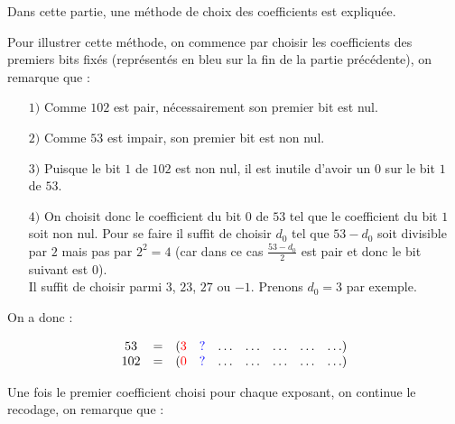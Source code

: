 \documentclass[12pt, a4paper]{memoir}
\begin{document}
 Dans cette partie, une méthode de choix des coefficients est expliquée.
 
 Pour illustrer cette méthode, on commence par choisir les coefficients des premiers bits fixés (représentés 
 en bleu sur la fin de la partie précédente), on remarque que :
 \begin{itemize}
  \item [$1)$] Comme $102$ est pair, nécessairement son premier bit est nul.
  \item [$2)$] Comme $53$ est impair, son premier bit est non nul.
  \item [$3)$] Puisque le bit $1$ de $102$ est non nul, il est inutile d'avoir un $0$ sur le bit $1$ de $53$.
  \item [$4)$] On choisit donc le coefficient du bit $0$ de $53$ tel que le coefficient du bit $1$ soit non nul.
  Pour se faire il suffit de choisir $d_0$ tel que $53 - d_0$ soit divisible par $2$ mais pas par $2^2 = 4$ (car dans 
  ce cas $\frac{53 - d_0}{2}$ est pair et donc le bit suivant est $0$). \\
  Il suffit de choisir parmi $3$, $23$, $27$ ou $-1$. Prenons $d_0 = 3$ par exemple.
 \end{itemize}

 On a donc :
 
   $$\begin{array}{ccccccccc}
  53 & = & (\textcolor{red}{3} & \textcolor{blue}{?} & \ldots & \ldots & \ldots & \ldots & \ldots) \\
  102 & = & (\textcolor{red}{0} & \textcolor{blue}{?} & \ldots & \ldots & \ldots & \ldots & \ldots)
 \end{array}$$
 
 Une fois le premier coefficient choisi pour chaque exposant, on continue le recodage, on remarque que :
 
\end{document}
